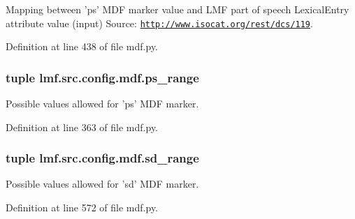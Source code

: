 Mapping between 'ps' M\+D\+F marker value and L\+M\+F part of speech Lexical\+Entry attribute value (input) Source\+: \href{http://www.isocat.org/rest/dcs/119}{\tt http\+://www.\+isocat.\+org/rest/dcs/119}. 



Definition at line 438 of file mdf.\+py.

\hypertarget{namespacelmf_1_1src_1_1config_1_1mdf_a59bb4fce205d8159bc72c946e3855c4a}{
\subsubsection[{ps\+\_\+range}]{\setlength{\rightskip}{0pt plus 5cm}tuple lmf.\+src.\+config.\+mdf.\+ps\+\_\+range}}\label{namespacelmf_1_1src_1_1config_1_1mdf_a59bb4fce205d8159bc72c946e3855c4a}


Possible values allowed for 'ps' M\+D\+F marker. 



Definition at line 363 of file mdf.\+py.

\hypertarget{namespacelmf_1_1src_1_1config_1_1mdf_a69afee1e13ba980f4da1e6d7fb0c488a}{
\subsubsection[{sd\+\_\+range}]{\setlength{\rightskip}{0pt plus 5cm}tuple lmf.\+src.\+config.\+mdf.\+sd\+\_\+range}}\label{namespacelmf_1_1src_1_1config_1_1mdf_a69afee1e13ba980f4da1e6d7fb0c488a}


Possible values allowed for 'sd' M\+D\+F marker. 



Definition at line 572 of file mdf.\+py.

